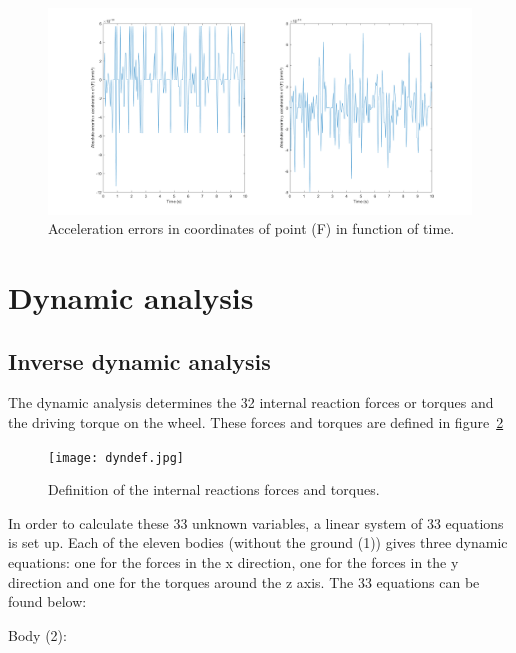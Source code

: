 \documentclass[a4paper]{article}
\begin{document}
\begin{figure}
	\centering
	
	\includegraphics[width = \textwidth]{contracc.png}
	
	\caption{Acceleration errors in coordinates of point (F) in function of time.}
	\label{fig:contracc}
	
\end{figure}

\section{Dynamic analysis}

\subsection{Inverse dynamic analysis}

The dynamic analysis determines the 32 internal reaction forces or torques and the driving torque on the wheel. These forces and torques are defined in figure~\ref{fig:dyndef} 

\begin{figure}[h]
	\centering
	
	\texttt{[image: dyndef.jpg]}
	
	\caption{Definition of the internal reactions forces and torques.}
	\label{fig:dyndef}
	
\end{figure}

In order to calculate these 33 unknown variables, a linear system of 33 equations is set up. Each of the eleven bodies (without the ground (1)) gives three dynamic equations: one for the forces in the x direction, one for the forces in the y direction and one for the torques around the z axis. The 33 equations can be found below:

\bigskip

Body (2):
\end{document}
